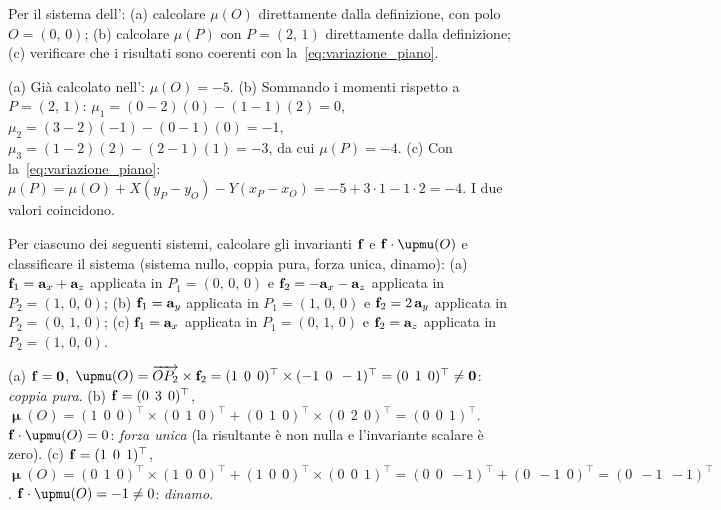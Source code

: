 \begin{esercizio}
	\label{ex:C02_variazione_momento}
	
	Per il sistema dell':
	(a) calcolare $\mu(O)$ direttamente dalla definizione, con polo $O = (0,\,0)$;
	(b) calcolare $\mu(P)$ con $P = (2,\,1)$ direttamente dalla definizione;
	(c) verificare che i risultati sono coerenti con la~\eqref{eq:variazione_piano}.
	
	\risultato (a) Già calcolato nell': $\mu(O) = -5$. (b) Sommando i momenti rispetto a $P = (2,\,1)$: $\mu_1 = (0-2)(0) - (1-1)(2) = 0$, $\mu_2 = (3-2)(-1) - (0-1)(0) = -1$, $\mu_3 = (1-2)(2) - (2-1)(1) = -3$, da cui $\mu(P) = -4$. (c) Con la~\eqref{eq:variazione_piano}: $\mu(P) = \mu(O) + X(y_P - y_O) - Y(x_P - x_O) = -5 + 3 \cdot 1 - 1 \cdot 2 = -4$. I due valori coincidono.
	
\end{esercizio}

\begin{esercizio}
	\label{ex:C02_classificazione_3D}
	
	Per ciascuno dei seguenti sistemi, calcolare gli invarianti $\mathbf{f}$ e $\fb \cdot \bm{\upmu}(O)$ e classificare il sistema (sistema nullo, coppia pura, forza unica, dinamo):
	(a) $\mathbf{f}_1 = \mathbf{a}_x + \mathbf{a}_z$ applicata in $P_1 = (0,\,0,\,0)$ e $\mathbf{f}_2 = -\mathbf{a}_x - \mathbf{a}_z$ applicata in $P_2 = (1,\,0,\,0)$;
	(b) $\mathbf{f}_1 = \mathbf{a}_y$ applicata in $P_1 = (1,\,0,\,0)$ e $\mathbf{f}_2 = 2\,\mathbf{a}_y$ applicata in $P_2 = (0,\,1,\,0)$;
	(c) $\mathbf{f}_1 = \mathbf{a}_x$ applicata in $P_1 = (0,\,1,\,0)$ e $\mathbf{f}_2 = \mathbf{a}_z$ applicata in $P_2 = (1,\,0,\,0)$.
	
	\risultato (a) $\mathbf{f} = \mathbf{0}$, $\bm{\upmu}(O) = \overrightarrow{OP_2} \times \fb_2 = (1\;\,0\;\,0)^\top \times (-1\;\,0\;\,-1)^\top = (0\;\,1\;\,0)^\top \neq \zerovb$: \textit{coppia pura}. (b) $\mathbf{f} = (0\;\,3\;\,0)^\top$, $\bm{\upmu}(O) = (1\;\,0\;\,0)^\top \times (0\;\,1\;\,0)^\top + (0\;\,1\;\,0)^\top \times (0\;\,2\;\,0)^\top = (0\;\,0\;\,1)^\top$. $\fb \cdot \bm{\upmu}(O) = 0$: \textit{forza unica} (la risultante è non nulla e l'invariante scalare è zero). (c) $\mathbf{f} = (1\;\,0\;\,1)^\top$, $\bm{\upmu}(O) = (0\;\,1\;\,0)^\top \times (1\;\,0\;\,0)^\top + (1\;\,0\;\,0)^\top \times (0\;\,0\;\,1)^\top = (0\;\,0\;\,-1)^\top + (0\;\,-1\;\,0)^\top = (0\;\,-1\;\,-1)^\top$. $\fb \cdot \bm{\upmu}(O) = -1 \neq 0$: \textit{dinamo}.
	
\end{esercizio}

